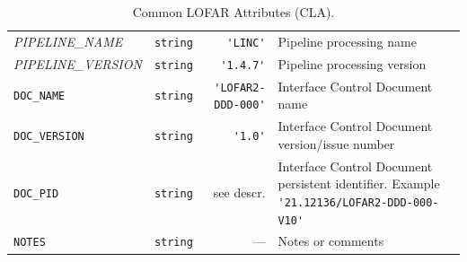 \begin{table}[htbp]
\begin{tabular}{|lp{1.5cm}rp{5cm}|}
    \small{\textit{PIPELINE\_NAME}}  & \small\verb|string|  & \verb|'LINC'|  & Pipeline processing name \\
    \small{\textit{PIPELINE\_VERSION}} & \small\verb|string|  & \verb|'1.4.7'|  & Pipeline processing version \\
    \small \verb|DOC_NAME| & \small\verb|string|  & \verb|'LOFAR2-DDD-000'|  & Interface Control Document name \\
    \small \verb|DOC_VERSION| & \small\verb|string|  & \verb|'1.0'|  & Interface Control Document version/issue number \\
     \small \verb|DOC_PID| & \small\verb|string|  & see descr.  & Interface Control Document persistent identifier. Example  \verb|'21.12136/LOFAR2-DDD-000-V10'| \\
    \small \verb|NOTES| & \small\verb|string|  & ---  & Notes or comments \\
   \hline
  \end{tabular}
  \caption{Common LOFAR Attributes (CLA).}
  \label{tab:lofar common metadata}
\end{table}

